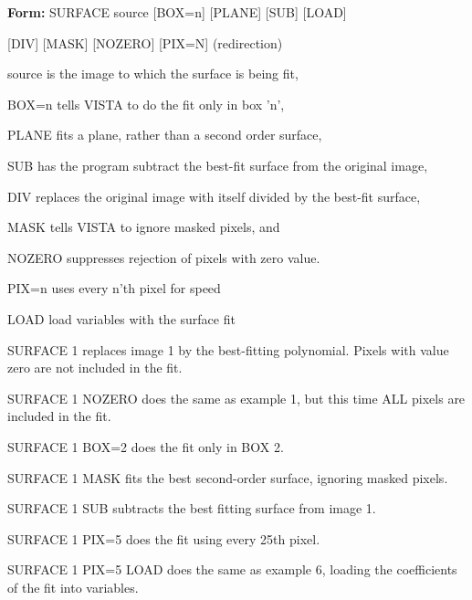 {\newpage\clearpage
{}%
\begin{command}
  \item[\textbf{Form: }SURFACE source {[BOX=n]} {[PLANE]} {[SUB]} 
       {[LOAD]}\hfill]{}
  \item{{[DIV]} {[MASK]} {[NOZERO]} {[PIX=N]} (redirection)}
  \item[source]{is the image to which the surface is being fit,}
  \item[BOX=n]{tells VISTA to do the fit only in box 'n',}
  \item[PLANE]{fits a plane, rather than a second order surface,}
  \item[SUB]{has the program subtract the best-fit surface
       from the original image,}
  \item[DIV]{replaces the original image with itself divided by the 
       best-fit surface,}
  \item[MASK]{tells VISTA to ignore masked pixels, and}
  \item[NOZERO]{suppresses rejection of pixels with zero value.}
  \item[PIX=n]{uses every n'th pixel for speed}
  \item[LOAD]{load variables with the surface fit}
\end{command}%
\lthtmlfigureZ
\lthtmlcheckvsize\clearpage}

{\newpage\clearpage
{}%
\begin{example}
  \item[SURFACE 1\hfill]{replaces image 1 by the best-fitting
       polynomial.  Pixels with value zero are not included in the fit.}
  \item[SURFACE 1 NOZERO\hfill]{does the same as example 1, but this
       time ALL pixels are included in the fit.}
  \item[SURFACE 1 BOX=2\hfill]{does the fit only in BOX 2.}
  \item[SURFACE 1 MASK\hfill]{fits the best second-order surface, ignoring
       masked pixels.}
  \item[SURFACE 1 SUB\hfill]{subtracts the best fitting surface from image 1.}
  \item[SURFACE 1 PIX=5\hfill]{does the fit using every 25th pixel.}
  \item[SURFACE 1 PIX=5 LOAD\hfill]{does the same as example 6, loading the
       coefficients of the fit into variables.}
\end{example}%
\lthtmlfigureZ
\lthtmlcheckvsize\clearpage}

